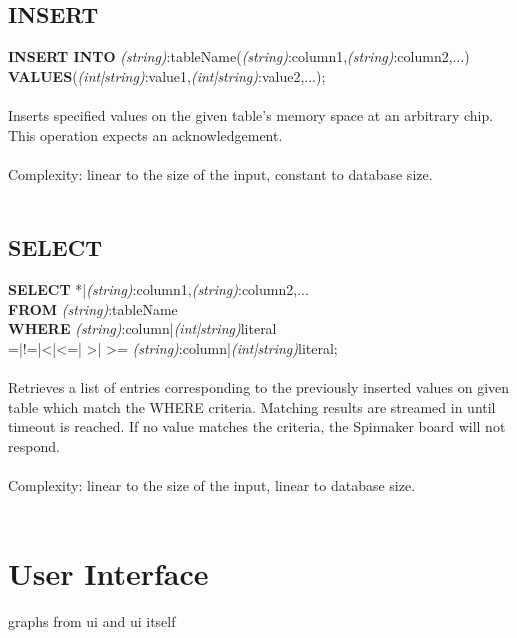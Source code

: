 \subsection{INSERT}   
   
 \noindent
  {\large\textbf{INSERT INTO} \textit{(string)}:tableName(\textit{(string)}:column1,\textit{(string)}:column2,...)\\
  \textbf{VALUES}(\textit{(int|string)}:value1,\textit{(int|string)}:value2,...);}\\\\
\noindent
  Inserts specified values on the given table's memory space at an arbitrary chip. This operation expects an acknowledgement.\\\\
\noindent
   Complexity: linear to the size of the input, constant to database size.\\\\

\subsection{SELECT}   
   
\noindent
  {\large\textbf{SELECT} *|\textit{(string)}:column1,\textit{(string)}:column2,...\\
  \textbf{FROM} \textit{(string)}:tableName\\
  \textbf{WHERE} \textit{(string)}:column|\textit{(int|string)}literal \\=|!=|\textless |\textless =|
  \textgreater | \textgreater = \textit{(string)}:column|\textit{(int|string)}literal;}\\\\
\noindent
  Retrieves a list of entries corresponding to the previously inserted values on given table which match the WHERE criteria. Matching results are streamed in until timeout is reached. If no value matches the criteria, the Spinnaker board will not respond.\\\\
\noindent
Complexity: linear to the size of the input, linear to database size.\\\\
  
\section{User Interface} 

graphs from ui and ui itself 
  
